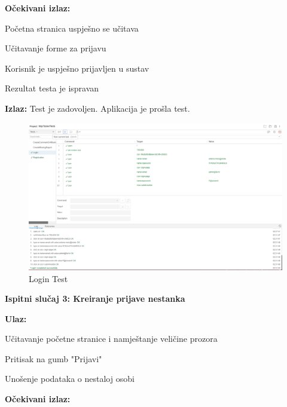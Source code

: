 			\noindent \textbf{Očekivani izlaz:}
			
			\begin{packed_enum}
				
				\item Početna stranica uspješno se učitava
				\item Učitavanje forme za prijavu
				\item Korisnik je uspješno prijavljen u sustav
				\item Rezultat testa je ispravan
				
			\end{packed_enum}
			
			\noindent \textbf{Izlaz:} Test je zadovoljen. Aplikacija je prošla test.
			
			\begin{figure}[H] \includegraphics[width=\linewidth]{./slike/Testovi/Selenium/Selenium_2.png}
				\caption{Login Test}
			\end{figure}
			
			\eject
			
			\noindent \textbf{Ispitni slučaj 3: Kreiranje prijave nestanka}
			
			\noindent \textbf{Ulaz:}
			
			\begin{packed_enum}
				
				\item Učitavanje početne stranice i namještanje veličine prozora
				\item Pritisak na gumb "Prijavi"
				\item Unošenje podataka o nestaloj osobi
				
			\end{packed_enum}
			
			\noindent \textbf{Očekivani izlaz:}
			
